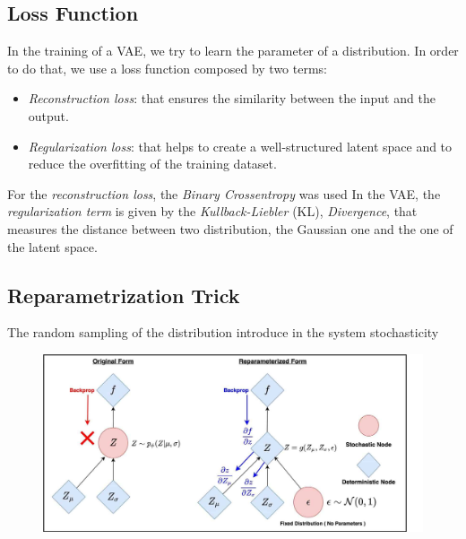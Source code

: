 \documentclass[12pt,a4paper,twocolumn]{article}
\begin{document}
			\subsection{Loss Function}
			In the training of a VAE, we try to learn the parameter of a distribution. In order to do that, we use a loss function composed by two terms:
			\begin{itemize}
				\item \emph{Reconstruction loss}: that ensures the similarity between the input and the output.
				\item \emph{Regularization loss}: that helps to create a well-structured latent space and to reduce the overfitting of the training dataset.
			\end{itemize}
			For the \emph{reconstruction loss}, the \emph{Binary Crossentropy} was used
			In the VAE, the \emph{regularization term} is given by the \emph{Kullback-Liebler} (KL), \emph{Divergence}, that measures the distance between two distribution, the Gaussian one and the one of the latent space.
			\subsection{Reparametrization Trick}
			\label{rep_trick}
			The random sampling of the distribution introduce in the system stochasticity  
			\begin{figure}[t]
				\centering
				\includegraphics[width=0.7\linewidth]{images/reparam-vae-2048x959}
				\caption{}
				\label{fig:rep_trick}
			\end{figure}
			
		\newpage
		
		\printbibliography
\end{document}
